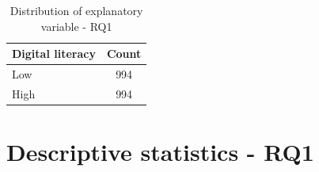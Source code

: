 \begin{table}[h!]
    \centering
    \caption{Distribution of explanatory variable - RQ1}
    \label{tab:explanatory_variable_rq1}
    \begin{tabular}{lc}
        \toprule
        Digital literacy & Count \\
        \midrule
        Low & 994 \\
        High & 994 \\
        \bottomrule
    \end{tabular}
\end{table}

\section{Descriptive statistics - RQ1}


